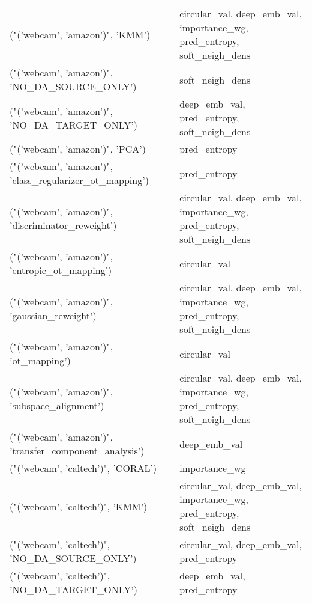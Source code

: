 \begin{tabular}{ll}
 ("('webcam', 'amazon')", 'KMM')                           & circular\_val, deep\_emb\_val, importance\_wg, pred\_entropy, soft\_neigh\_dens \\
 ("('webcam', 'amazon')", 'NO\_DA\_SOURCE\_ONLY')             & soft\_neigh\_dens                                                          \\
 ("('webcam', 'amazon')", 'NO\_DA\_TARGET\_ONLY')             & deep\_emb\_val, pred\_entropy, soft\_neigh\_dens                              \\
 ("('webcam', 'amazon')", 'PCA')                           & pred\_entropy                                                             \\
 ("('webcam', 'amazon')", 'class\_regularizer\_ot\_mapping')  & pred\_entropy                                                             \\
 ("('webcam', 'amazon')", 'discriminator\_reweight')        & circular\_val, deep\_emb\_val, importance\_wg, pred\_entropy, soft\_neigh\_dens \\
 ("('webcam', 'amazon')", 'entropic\_ot\_mapping')           & circular\_val                                                             \\
 ("('webcam', 'amazon')", 'gaussian\_reweight')             & circular\_val, deep\_emb\_val, importance\_wg, pred\_entropy, soft\_neigh\_dens \\
 ("('webcam', 'amazon')", 'ot\_mapping')                    & circular\_val                                                             \\
 ("('webcam', 'amazon')", 'subspace\_alignment')            & circular\_val, deep\_emb\_val, importance\_wg, pred\_entropy, soft\_neigh\_dens \\
 ("('webcam', 'amazon')", 'transfer\_component\_analysis')   & deep\_emb\_val                                                             \\
 ("('webcam', 'caltech')", 'CORAL')                        & importance\_wg                                                            \\
 ("('webcam', 'caltech')", 'KMM')                          & circular\_val, deep\_emb\_val, importance\_wg, pred\_entropy, soft\_neigh\_dens \\
 ("('webcam', 'caltech')", 'NO\_DA\_SOURCE\_ONLY')            & circular\_val, deep\_emb\_val, pred\_entropy                                 \\
 ("('webcam', 'caltech')", 'NO\_DA\_TARGET\_ONLY')            & deep\_emb\_val, pred\_entropy                                               \\

\end{tabular}
